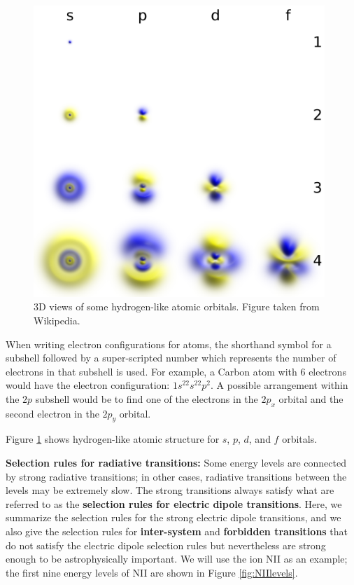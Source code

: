 \documentclass[a4paper,10pt]{article}
\begin{document}
\begin{figure}[t]
    \centering
    \includegraphics[width=11cm]{figures/orbitals_3D.png}
    \caption{\footnotesize{3D views of some hydrogen-like atomic orbitals. Figure taken from Wikipedia.}}
    \label{fig:orbitals3D}
\end{figure}

{\noindent}When writing electron configurations for atoms, the shorthand symbol for a subshell followed by a super-scripted number which represents the number of electrons in that subshell is used. For example, a Carbon atom with $6$ electrons would have the electron configuration: $1s^22s^22p^2$. A possible arrangement within the $2p$ subshell would be to find one of the electrons in the $2p_x$ orbital and the second electron in the $2p_y$ orbital. 

{\noindent}Figure \ref{fig:orbitals3D} shows hydrogen-like atomic structure for $s$, $p$, $d$, and $f$ orbitals.

{\noindent}\textbf{Selection rules for radiative transitions:} Some energy levels are connected by strong radiative transitions; in other cases, radiative transitions between the levels may be extremely slow. The strong transitions always satisfy what are referred to as the \textbf{selection rules for electric dipole transitions}. Here, we summarize the selection rules for the strong electric dipole transitions, and we also give the selection rules for \textbf{inter-system} and \textbf{forbidden transitions} that do not satisfy the electric dipole selection rules but nevertheless are strong enough to be astrophysically important. We will use the ion NII as an example; the first nine energy levels of NII are shown in Figure \ref{fig:NIIlevels}.
\end{document}
